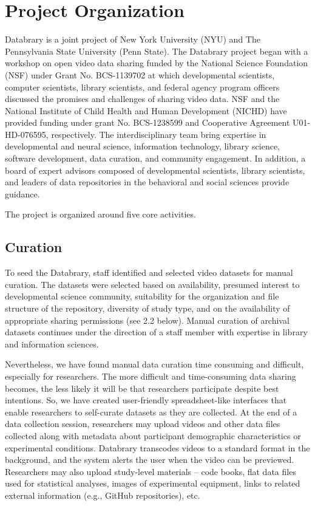 \documentclass{sig-alternate}
\begin{document}
\section{Project Organization}

Databrary is a joint project of New York University (NYU) and The
Pennsylvania State University (Penn State). The Databrary project began
with a workshop on open video data sharing funded by the National
Science Foundation (NSF) under Grant No. BCS-1139702 at which
developmental scientists, computer scientists, library scientists, and
federal agency program officers discussed the promises and challenges of
sharing video data. NSF and the National Institute of Child Health and
Human Development (NICHD) have provided funding under grant No.
BCS-1238599 and Cooperative Agreement U01-HD-076595, respectively. The
interdisciplinary team bring expertise in developmental and neural
science, information technology, library science, software development,
data curation, and community engagement. In addition, a board of expert
advisors composed of developmental scientists, library scientists, and
leaders of data repositories in the behavioral and social sciences
provide guidance.

The project is organized around five core activities.

\subsection{Curation}

To seed the Databrary, staff identified and selected video datasets for
manual curation. The datasets were selected based on availability,
presumed interest to developmental science community, suitability for
the organization and file structure of the repository, diversity of
study type, and on the availability of appropriate sharing permissions
(see 2.2 below). Manual curation of archival datasets continues under
the direction of a staff member with expertise in library and
information sciences.

Nevertheless, we have found manual data curation time consuming and
difficult, especially for researchers. The more difficult and
time-consuming data sharing becomes, the less likely it will be that
researchers participate despite best intentions. So, we have created
user-friendly spreadsheet-like interfaces that enable researchers to
self-curate datasets as they are collected. At the end of a data
collection session, researchers may upload videos and other data files
collected along with metadata about participant demographic
characteristics or experimental conditions. Databrary transcodes videos
to a standard format in the background, and the system alerts the user
when the video can be previewed. Researchers may also upload study-level
materials -- code books, flat data files used for statistical analyses,
images of experimental equipment, links to related external information
(e.g., GitHub repositories), etc.
\end{document}
